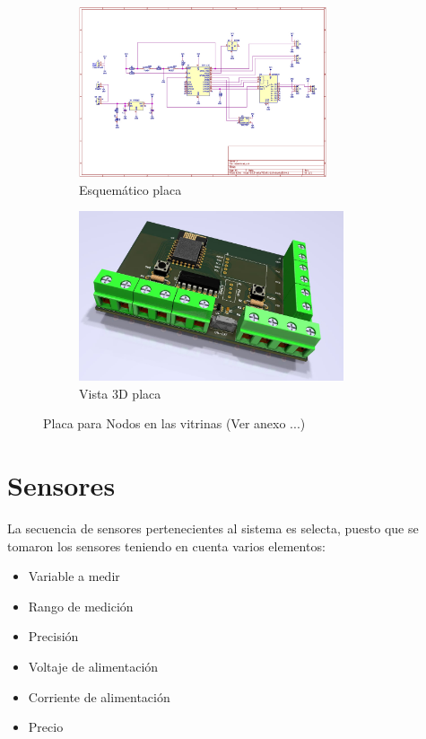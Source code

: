     \begin{figure}[H]
        \centering
        \begin{subfigure}[b]{0.45\linewidth}
        \includegraphics[width=\linewidth, height=5cm]{imagenes/esquematico nodo.jpg}
        \caption{Esquemático placa}
        \label{imag:esquematico_placa}
    \end{subfigure}
    \begin{subfigure}[b]{0.45\linewidth}
        \includegraphics[width=\linewidth, height=5cm]{imagenes/vista 3D.jpg}
        \caption{Vista 3D placa}
        \label{imag:vista3D_placa}
    \end{subfigure}
        \caption{Placa para Nodos en las vitrinas (Ver anexo ...)}
        \label{imag:placa_impresa}
    \end{figure}


\section{Sensores} \label{sec:sensores}

    La secuencia de sensores pertenecientes al sistema es selecta, puesto que se tomaron los sensores teniendo en cuenta varios elementos:

    \begin{itemize}
        \item Variable a medir
        \item Rango de medición
        \item Precisión
        \item Voltaje de alimentación
        \item Corriente de alimentación
        \item Precio
    \end{itemize}

